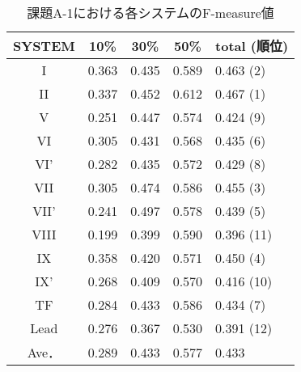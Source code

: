 \begin{table*}[t]
{\small
\caption{課題A-1における各システムのF-measure値\label{table:aefscore}}
\begin{center}
\begin{tabular}{|c||c|c|c||l|}\hline
SYSTEM & 10\%  & 30\%  & 50\%  & total (順位)\\ \hline\hline
I      & 0.363 & 0.435 & 0.589 & 0.463 (2)\\ \hline 
II     & 0.337 & 0.452 & 0.612 & 0.467 (1)\\ \hline 
V      & 0.251 & 0.447 & 0.574 & 0.424 (9)\\ \hline 
VI     & 0.305 & 0.431 & 0.568 & 0.435 (6)\\ \hline 
VI'    & 0.282 & 0.435 & 0.572 & 0.429 (8)\\ \hline 
VII    & 0.305 & 0.474 & 0.586 & 0.455 (3)\\ \hline 
VII'   & 0.241 & 0.497 & 0.578 & 0.439 (5)\\ \hline 
VIII   & 0.199 & 0.399 & 0.590 & 0.396 (11)\\ \hline 
IX     & 0.358 & 0.420 & 0.571 & 0.450 (4)\\ \hline 
IX'    & 0.268 & 0.409 & 0.570 & 0.416 (10)\\ \hline 
TF     & 0.284 & 0.433 & 0.586 & 0.434 (7)\\ \hline 
Lead   & 0.276 & 0.367 & 0.530 & 0.391 (12)\\ \hline\hline 
Ave．  & 0.289 & 0.433 & 0.577 & 0.433 \\ \hline 
\end{tabular}
\end{center}
}


\end{table*}
